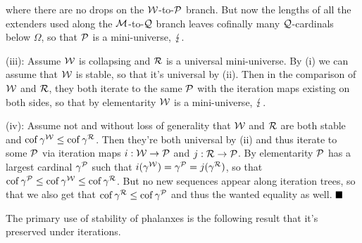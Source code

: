 where there are no drops on the $\W$-to-$\P$ branch. But now the lengths of all the extenders used along the $\M$-to-$\Q$ branch leaves cofinally many $\Q$-cardinals below $\Omega$, so that $\P$ is a mini-universe, $\contr$.

\qquad (iii): Assume $\W$ is collapsing and $\R$ is a universal mini-universe. By (i) we can assume that $\W$ is stable, so that it's universal by (ii). Then in the comparison of $\W$ and $\R$, they both iterate to the same $\P$ with the iteration maps existing on both sides, so that by elementarity $\W$ is a mini-universe, $\contr$.

\qquad (iv): Assume not and without loss of generality that $\W$ and $\R$ are both stable and $\cof\gamma^{\W}\leq\cof\gamma^{\R}$. Then they're both universal by (ii) and thus iterate to some $\P$ via iteration maps $i:\W\to\P$ and $j:\R\to\P$. By elementarity $\P$ has a largest cardinal $\gamma^{\P}$ such that $i(\gamma^{\W})=\gamma^{\P}=j(\gamma^{\R})$, so that $\cof\gamma^{\P}\leq\cof\gamma^{\W}\leq\cof\gamma^{\R}$. But no new sequences appear along iteration trees, so that we also get that $\cof\gamma^{\R}\leq\cof\gamma^{\P}$ and thus the wanted equality as well.
$\qed$



The primary use of stability of phalanxes is the following result that it's preserved under iterations.

